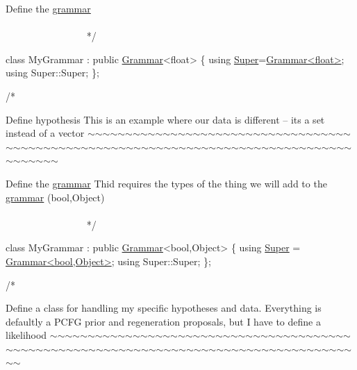 \begin{DoxyCode}
    Define the \hyperlink{class_l_o_t_hypothesis_affae32db28c39df676809ae47e14e7cf}{grammar}
   ~~~~~~~~~~~~~~~~~~~~~~~~~~~~~~~~~~~~~~~~~~~~~~~~~~~~~~~~~~~~~~~~~~~~~~~~~~~~~~~~~~~~~~~~ */



\textcolor{keyword}{class }MyGrammar : \textcolor{keyword}{public} \hyperlink{class_grammar}{Grammar}<float> \{
    \textcolor{keyword}{using} \hyperlink{class_my_hypothesis_a12e3d952f8fca502912d3bd868fa9f99}{Super}=\hyperlink{class_grammar}{Grammar<float>};
    \textcolor{keyword}{using} Super::Super;
\};


\textcolor{comment}{/*}
\end{DoxyCode}
 Define hypothesis This is an example where our data is different -- it\textquotesingle{}s a set instead of a vector $\sim$$\sim$$\sim$$\sim$$\sim$$\sim$$\sim$$\sim$$\sim$$\sim$$\sim$$\sim$$\sim$$\sim$$\sim$$\sim$$\sim$$\sim$$\sim$$\sim$$\sim$$\sim$$\sim$$\sim$$\sim$$\sim$$\sim$$\sim$$\sim$$\sim$$\sim$$\sim$$\sim$$\sim$$\sim$$\sim$$\sim$$\sim$$\sim$$\sim$$\sim$$\sim$$\sim$$\sim$$\sim$$\sim$$\sim$$\sim$$\sim$$\sim$$\sim$$\sim$$\sim$$\sim$$\sim$$\sim$$\sim$$\sim$$\sim$$\sim$$\sim$$\sim$$\sim$$\sim$$\sim$$\sim$$\sim$$\sim$$\sim$$\sim$$\sim$$\sim$$\sim$$\sim$$\sim$$\sim$$\sim$$\sim$$\sim$$\sim$$\sim$$\sim$$\sim$$\sim$$\sim$$\sim$$\sim$$\sim$


\begin{DoxyCode}
    Define the \hyperlink{class_l_o_t_hypothesis_affae32db28c39df676809ae47e14e7cf}{grammar}
    Thid requires the types of the thing we will add to the \hyperlink{class_l_o_t_hypothesis_affae32db28c39df676809ae47e14e7cf}{grammar} (\textcolor{keywordtype}{bool},Object)
   ~~~~~~~~~~~~~~~~~~~~~~~~~~~~~~~~~~~~~~~~~~~~~~~~~~~~~~~~~~~~~~~~~~~~~~~~~~~~~~~~~~~~~~~~ */



\textcolor{keyword}{class }MyGrammar : \textcolor{keyword}{public} \hyperlink{class_grammar}{Grammar}<bool,Object> \{
    \textcolor{keyword}{using} \hyperlink{class_my_hypothesis_a12e3d952f8fca502912d3bd868fa9f99}{Super} =  \hyperlink{class_grammar}{Grammar<bool,Object>};
    \textcolor{keyword}{using} Super::Super;
\};


\textcolor{comment}{/*}
\end{DoxyCode}
 Define a class for handling my specific hypotheses and data. Everything is defaultly a P\+C\+FG prior and regeneration proposals, but I have to define a likelihood $\sim$$\sim$$\sim$$\sim$$\sim$$\sim$$\sim$$\sim$$\sim$$\sim$$\sim$$\sim$$\sim$$\sim$$\sim$$\sim$$\sim$$\sim$$\sim$$\sim$$\sim$$\sim$$\sim$$\sim$$\sim$$\sim$$\sim$$\sim$$\sim$$\sim$$\sim$$\sim$$\sim$$\sim$$\sim$$\sim$$\sim$$\sim$$\sim$$\sim$$\sim$$\sim$$\sim$$\sim$$\sim$$\sim$$\sim$$\sim$$\sim$$\sim$$\sim$$\sim$$\sim$$\sim$$\sim$$\sim$$\sim$$\sim$$\sim$$\sim$$\sim$$\sim$$\sim$$\sim$$\sim$$\sim$$\sim$$\sim$$\sim$$\sim$$\sim$$\sim$$\sim$$\sim$$\sim$$\sim$$\sim$$\sim$$\sim$$\sim$$\sim$$\sim$$\sim$$\sim$$\sim$$\sim$$\sim$$\sim$ 

